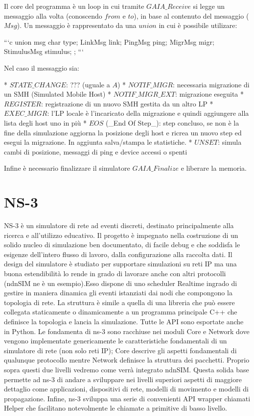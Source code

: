 Il core del programma è un loop in cui tramite $GAIA\_Receive$ si legge un messaggio alla volta (conoscendo $from$ e $to$), in base al contenuto del messaggio ($Msg$). Un messaggio è rappresentato da una $union$ in cui è possibile utilizare:

```c
union msg {
    char type;
    LinkMsg link;
    PingMsg ping;
    MigrMsg migr;
    StimulusMsg stimulus;
};
```

Nel caso il messaggio sia:

* $STATE\_CHANGE$: ??? (uguale a $A$)
* $NOTIF\_MIGR$: necessaria migrazione di un SMH (Simulated Mobile Host)
* $NOTIF\_MIGR\_EXT$: migrazione eseguita
* $REGISTER$: registrazione di un nuovo SMH gestita da un altro LP
* $EXEC\_MIGR$: l'LP locale è l'incaricato della migrazione e quindi aggiungere alla lista degli host uno in più
* $EOS$ (\_End Of Step\_): step concluso, se non è la fine della simulazione aggiorna la posizione degli host e ricrea un nuovo step ed esegui la migrazione. In aggiunta salva/stampa le statistiche.
* $UNSET$:  simula cambi di posizione, messaggi di ping e device accessi o spenti

Infine è necessario finalizzare il simulatore $GAIA\_Finalize$ e liberare la memoria.

\section{NS-3}
NS-3 è un simulatore di rete ad eventi discreti, destinato principalmente alla ricerca e all'utilizzo educativo. Il progetto è impegnato nella costruzione di un solido nucleo di simulazione ben documentato, di facile debug e che soddisfa le esigenze dell'intero flusso di lavoro, dalla configurazione alla raccolta dati. Il design del simulatore è studiato per supportare simulazioni su reti IP ma una buona estendibilità lo rende in grado di lavorare anche con altri protocolli (ndnSIM ne è un esempio).Esso dispone di uno scheduler Realtime ingrado di gestire in maniera dinamica gli eventi istanziati dai nodi che compongono la topologia di rete.
La struttura è simile a quella di una libreria che può essere collegata staticamente o dinamicamente a un programma principale C++ che definisce la topologia e lancia la simulazione. Tutte le API sono esportate anche in Python.
Le fondamenta di ns-3 sono racchiuse nei moduli Core e Network dove vengono implementate genericamente le caratteristiche fondamentali di un simulatore di rete (non solo reti IP);
Core descrive gli aspetti fondamentali di qualunque protocollo mentre Network definisce la struttura dei pacchetti. Proprio sopra questi due livelli vedremo come verrà integrato ndnSIM.
Questa solida base permette ad ns-3 di andare a sviluppare nei livelli superiori aspetti di maggiore dettaglio come applicazioni, dispositivi di rete, modelli di movimento e modelli di propagazione. Infine, ns-3 sviluppa una serie di convenienti API wrapper chiamati Helper che facilitano notevolmente le chiamate a primitive di basso livello.


